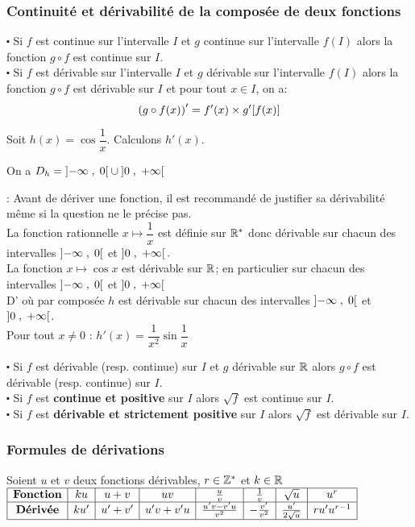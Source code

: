 \subsubsection*{Continuité et dérivabilité de la composée de deux fonctions}
\begin{property}
$ \centerdot $ Si $ f $ est continue sur l'intervalle $ I $ et $ g $ continue sur l'intervalle $ f(I) $ alors la fonction $ g\circ f $ est continue sur  $ I $.\\
$ \centerdot $ Si $ f $ est dérivable sur l'intervalle $ I $ et $ g $ dérivable sur l'intervalle $ f(I) $ alors la fonction $ g\circ f $ est dérivable sur $ I $ et pour tout $ x\in I $, on a:
\[\left(g\circ f(x)\right)'= f'(x)\times g'[f(x)] \]
\end{property}
\begin{example} 
Soit $h(x)= \cos \dfrac{1}{x}$. Calculons  $h'(x) $.

On a   $D_{h}= \left]-\infty \;,\; 0\right[\cup \left]0 \;,\; +\infty\right[ $

\textbf{\color{red}{Attention}}:  Avant de dériver une fonction, il est recommandé de justifier sa dérivabilité même si la question ne le précise pas.\\
La fonction rationnelle $ x\mapsto \dfrac{1}{x} $ est  définie sur $ \mathbb{R}^* $ donc dérivable sur chacun des intervalles $\left]-\infty \;,\; 0\right[ $ et $\left]0 \;,\; +\infty\right[. $\\
La fonction $ x\mapsto \cos x $ est dérivable sur $ \mathbb{R} $; en particulier sur chacun des intervalles $\left]-\infty \;,\; 0\right[ $ et $\left]0 \;,\; +\infty\right[ $\\ D' où par  composée $ h $ est dérivable  sur chacun des intervalles $\left]-\infty \;,\; 0\right[ $ et $\left]0 \;,\; +\infty\right[ $.\\
Pour tout   $ x\neq 0 $  \quad :    $h'(x)=\dfrac{1}{x^{2}}\sin \dfrac{1}{x} $ 

\end{example}
\begin{corollary}
$ \centerdot $ Si $ f $ est dérivable  (resp. continue) sur $ I $  et $ g $ dérivable sur $ \mathbb{R} $  alors $ g \circ f $ est dérivable (resp. continue) sur $ I. $\\
$ \centerdot $ Si $ f $ est \textbf{ continue et positive} sur $ I $ alors $ \sqrt{f} $ est continue sur $ I $.\\
$ \centerdot $ Si $ f $ est \textbf{ dérivable et strictement positive } sur $ I $ alors $ \sqrt{f} $ est dérivable sur $ I $.
\end{corollary}


\subsubsection*{Formules de dérivations}
Soient $u $ et $v $ deux fonctions dérivables, $ r\in\mathbb{Z}^* $ et $ k\in\mathbb{R} $\\
$\begin{array}{|c|c|c|c|c|c|c|c|}
\hline 
\textbf{Fonction} & ku & u+v & uv & \frac{u}{v} & \frac{1}{v} & \sqrt{u} & u^{r} \\     
\hline 
\textbf{Dérivée} & ku' & u'+v' & u'v+ v'u & \frac{u'v- v'u}{v^{2}} & -\frac{v'}{v^{2}} & \frac{u'}{2\sqrt{u}} & ru'u^{r-1} \\    
\hline
\end{array}$

